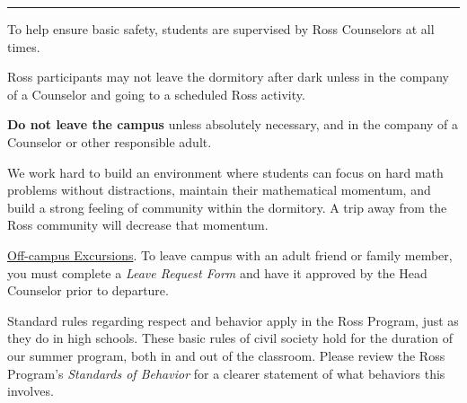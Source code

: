 \documentclass{ross}
\begin{document}
\bigskip\hrule
\pagebreak

To help ensure basic safety, students are supervised 
by Ross Counselors at all times.

Ross participants may not leave the dormitory after dark unless 
in the company of a Counselor and going to a scheduled Ross activity.

\textbf{Do not leave the campus} unless absolutely necessary, and in
the company of a Counselor or other responsible adult.

We work hard to build an environment where students can focus on hard math problems
without distractions, maintain their mathematical momentum, 
and build a strong feeling of community within the dormitory. 
A trip away from the Ross community will decrease that momentum.

\underline{Off-campus Excursions}.  To leave campus with
an adult friend or family member, you must complete a {\it Leave Request Form} 
and have it approved by the Head Counselor prior to departure.

Standard rules regarding respect and behavior apply in the Ross
Program, just as they do in high schools. These basic rules of civil society hold 
for the duration of our summer program, both in and out of the classroom. 
Please review the Ross Program's \textit{Standards of Behavior} for
a clearer statement of what behaviors this involves.
\end{document}
